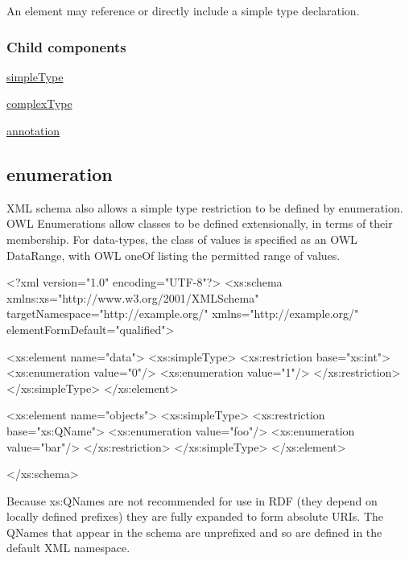 An element may reference or directly include a simple type declaration.\hypertarget{element_elementChildren}{}\subsubsection{Child components}\label{element_elementChildren}

\begin{DoxyItemize}
\item \hyperlink{simpletype}{simpleType}
\item \hyperlink{complextype}{complexType}
\item \hyperlink{annotation}{annotation} 
\end{DoxyItemize}\hypertarget{enumeration}{}\subsection{enumeration}\label{enumeration}
XML schema also allows a simple type restriction to be defined by enumeration. OWL Enumerations allow classes to be defined extensionally, in terms of their membership. For data-\/types, the class of values is specified as an OWL DataRange, with OWL oneOf listing the permitted range of values.


\begin{DoxyCodeInclude}
<?xml version="1.0" encoding="UTF-8"?>
<xs:schema xmlns:xs="http://www.w3.org/2001/XMLSchema" 
        targetNamespace="http://example.org/" xmlns="http://example.org/"
        elementFormDefault="qualified">
        
        <xs:element name="data">
                <xs:simpleType>
                        <xs:restriction base="xs:int">
                                <xs:enumeration value="0"/>
                                <xs:enumeration value="1"/>
                        </xs:restriction>
                </xs:simpleType>
        </xs:element>

        <xs:element name="objects">
                <xs:simpleType>
                        <xs:restriction base="xs:QName">
                                <xs:enumeration value="foo"/>
                                <xs:enumeration value="bar"/>
                        </xs:restriction>
                </xs:simpleType>
        </xs:element>

</xs:schema>
\end{DoxyCodeInclude}


Because xs:QNames are not recommended for use in RDF (they depend on locally defined prefixes) they are fully expanded to form absolute URIs. The QNames that appear in the schema are unprefixed and so are defined in the default XML namespace.


